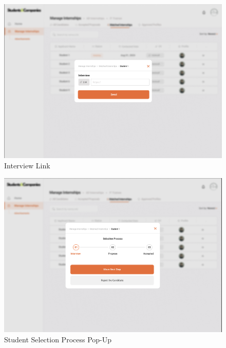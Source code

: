 \documentclass{article}
\begin{document}
\begin{figure}[H]
    \centering
    \includegraphics[scale = 0.42]{figures/UserInterfaces/Company/InterviewLink.png}
    \caption{Interview Link}
     \centering
\end{figure}
\begin{figure}[H]
    \centering
    \includegraphics[scale = 0.42]{figures/UserInterfaces/Company/SelectionProcess.png}
    \caption{Student Selection Process Pop-Up}
     \centering
\end{figure}
\end{document}
